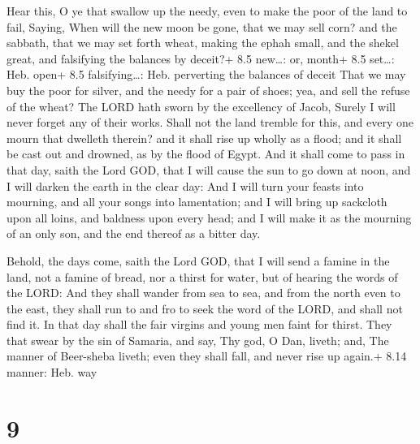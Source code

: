  Hear this, O ye that swallow up the needy, even to make
the poor of the land to fail,  Saying, When will the new
moon be gone, that we may sell corn? and the sabbath, that we may set
forth wheat, making the ephah small, and the shekel great, and
falsifying the balances by deceit?+ 8.5 new\ldots: or, month+ 8.5
set\ldots: Heb. open+ 8.5 falsifying\ldots: Heb. perverting the balances
of deceit  That we may buy the poor for silver, and the
needy for a pair of shoes; yea, and sell the refuse of the wheat?
 The LORD hath sworn by the excellency of Jacob, Surely I
will never forget any of their works.  Shall not the land
tremble for this, and every one mourn that dwelleth therein? and it
shall rise up wholly as a flood; and it shall be cast out and drowned,
as by the flood of Egypt.  And it shall come to pass in that
day, saith the Lord GOD, that I will cause the sun to go down at noon,
and I will darken the earth in the clear day:  And I will
turn your feasts into mourning, and all your songs into lamentation; and
I will bring up sackcloth upon all loins, and baldness upon every head;
and I will make it as the mourning of an only son, and the end thereof
as a bitter day.

 Behold, the days come, saith the Lord GOD, that I will
send a famine in the land, not a famine of bread, nor a thirst for
water, but of hearing the words of the LORD:  And they
shall wander from sea to sea, and from the north even to the east, they
shall run to and fro to seek the word of the LORD, and shall not find
it.  In that day shall the fair virgins and young men faint
for thirst.  They that swear by the sin of Samaria, and
say, Thy god, O Dan, liveth; and, The manner of Beer-sheba liveth; even
they shall fall, and never rise up again.+ 8.14 manner: Heb. way

\hypertarget{section-8}{%
\section{9}\label{section-8}}

